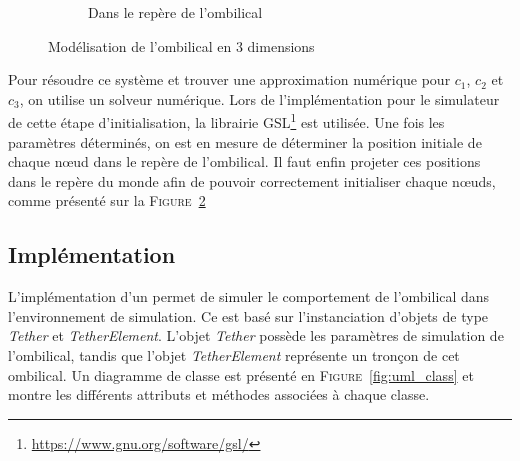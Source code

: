 \begin{figure}[!htb]
\begin{subfigure}[b]{0.45\textwidth}
						\caption{Dans le repère de l'ombilical}
						\label{fig:2d_plot}
					\end{subfigure}
					\caption{Modélisation de l'ombilical en 3 dimensions}
					\label{fig:tether_plot}
				\end{figure}
				
				Pour résoudre ce système et trouver une approximation numérique pour $c_1$, $c_2$ et $c_3$, on utilise un solveur numérique. Lors de l'implémentation pour le simulateur de cette étape d'initialisation, la librairie \gls{GSL}\footnote{\url{https://www.gnu.org/software/gsl/}} est utilisée. Une fois les paramètres déterminés, on est en mesure de déterminer la position initiale de chaque n\oe ud dans le repère de l'ombilical. Il faut enfin projeter ces positions dans le repère du monde afin de pouvoir correctement initialiser chaque n\oe uds, comme présenté sur la \textsc{Figure}~\ref{fig:tether_plot}
			
			\subsection{Implémentation}
				L'implémentation d'un \plugin{} \gazebo{} permet de simuler le comportement de l'ombilical dans l'environnement de simulation. Ce \plugin{} est basé sur l'instanciation d'objets de type \textit{Tether} et \textit{TetherElement}. L'objet \textit{Tether} possède les paramètres de simulation de l'ombilical, tandis que l'objet \textit{TetherElement} représente un tronçon de cet ombilical. Un diagramme de classe est présenté en \textsc{Figure}~\ref{fig:uml_class} et montre les différents attributs et méthodes associées à chaque classe.

